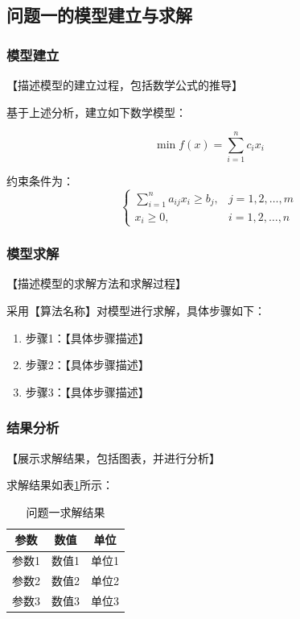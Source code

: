 \documentclass[12pt,a4paper]{ctexart}
\begin{document}
\subsection{问题一的模型建立与求解}

\subsubsection{模型建立}
【描述模型的建立过程，包括数学公式的推导】

基于上述分析，建立如下数学模型：

\begin{equation}
    \min f(x) = \sum_{i=1}^{n} c_i x_i
\end{equation}

约束条件为：
\begin{equation}
    \begin{cases}
        \sum_{i=1}^{n} a_{ij} x_i \geq b_j, & j=1,2,\ldots,m \\
        x_i \geq 0, & i=1,2,\ldots,n
    \end{cases}
\end{equation}

\subsubsection{模型求解}
【描述模型的求解方法和求解过程】

采用【算法名称】对模型进行求解，具体步骤如下：

\begin{enumerate}
    \item 步骤1：【具体步骤描述】
    \item 步骤2：【具体步骤描述】
    \item 步骤3：【具体步骤描述】
\end{enumerate}

\subsubsection{结果分析}
【展示求解结果，包括图表，并进行分析】

求解结果如表\ref{tab:result1}所示：

\begin{table}[H]
\centering
\begin{tabular}{ccc}
\toprule
\textbf{参数} & \textbf{数值} & \textbf{单位} \\
\midrule
参数1 & 数值1 & 单位1 \\
参数2 & 数值2 & 单位2 \\
参数3 & 数值3 & 单位3 \\
\bottomrule
\end{tabular}
\caption{问题一求解结果}
\label{tab:result1}
\end{table}
\end{document}
